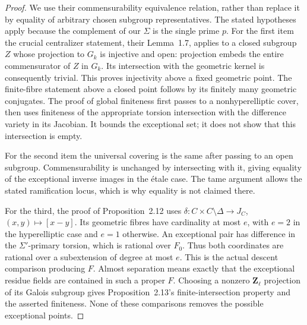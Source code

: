 \begin{proof}
We use their commensurability equivalence relation, rather than replace
it by equality of arbitrary chosen subgroup representatives.  The
stated hypotheses apply because the complement of our $\Sigma$ is
the single prime $p$.  For the first item the crucial centralizer
statement, their Lemma~1.7, applies to a closed subgroup $Z$ whose
projection to $G_k$ is injective and open: projection embeds the entire
commensurator of $Z$ in $G_k$.  Its intersection with the geometric
kernel is consequently trivial.  This proves injectivity above a
fixed geometric point.  The finite-fibre statement above a closed
point follows by its finitely many geometric conjugates.  The proof
of global finiteness first passes to a nonhyperelliptic cover, then
uses finiteness of the appropriate torsion intersection with the
difference variety in its Jacobian.  It bounds the exceptional set;
it does not show that this intersection is empty.

For the second item the universal covering is the same after passing
to an open subgroup.  Commensurability is unchanged by intersecting
with it, giving equality of the exceptional inverse images in the
\'etale case.  The tame argument allows the stated ramification locus,
which is why equality is not claimed there.

For the third, the proof of Proposition~2.12 uses
$\delta:C\times C\setminus\Delta\to J_C$,
$(x,y)\mapsto[x-y]$.  Its geometric fibres have cardinality at most
$e$, with $e=2$ in the hyperelliptic case and $e=1$ otherwise.
An exceptional pair has difference in the $\Sigma'$-primary torsion,
which is rational over $F_0$.  Thus both coordinates are rational
over a subextension of degree at most $e$.  This is the actual
descent comparison producing $F$.  Almost separation means exactly
that the exceptional residue fields are contained in such a proper
$F$.  Choosing a nonzero $\mathbf Z_\ell$ projection of its Galois
subgroup gives Proposition~2.13's finite-intersection property and
the asserted finiteness.  None of these comparisons removes the
possible exceptional points.
\end{proof}

